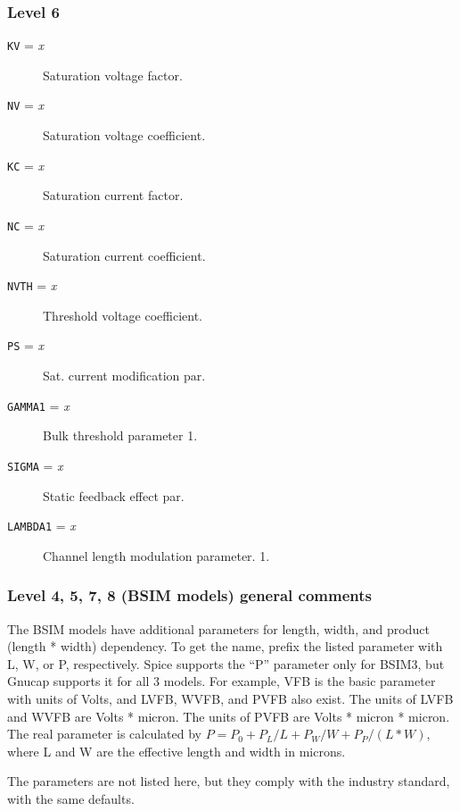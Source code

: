 \subsubsection{Level 6}
\begin{description}

\item[{\tt KV} = {\it x}]
Saturation voltage factor.

\item[{\tt NV} = {\it x}]
Saturation voltage coefficient.

\item[{\tt KC} = {\it x}]
Saturation current factor.

\item[{\tt NC} = {\it x}]
Saturation current coefficient.

\item[{\tt NVTH} = {\it x}]
Threshold voltage coefficient.

\item[{\tt PS} = {\it x}]
Sat. current modification  par.

\item[{\tt GAMMA1} = {\it x}]
Bulk threshold parameter 1.

\item[{\tt SIGMA} = {\it x}]
Static feedback effect par.

\item[{\tt LAMBDA1} = {\it x}]
Channel length modulation parameter. 1.

\end{description}
\subsubsection{Level 4, 5, 7, 8 (BSIM models) general comments}

The BSIM models have additional parameters for length, width, and
product (length * width) dependency.  To get the name, prefix the
listed parameter with L, W, or P, respectively.  Spice supports the
``P'' parameter only for BSIM3, but Gnucap supports it for all 3
models.  For example, VFB is the basic parameter with units of Volts,
and LVFB, WVFB, and PVFB also exist.  The units of LVFB and WVFB are
Volts * micron.  The units of PVFB are Volts * micron * micron.  The
real parameter is calculated by $P = P_0 + P_L / L + P_W / W + P_P /
(L*W)$, where L and W are the effective length and width in microns.

The parameters are not listed here, but they comply with the industry
standard, with the same defaults.

